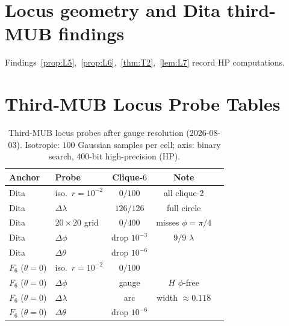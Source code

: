 \documentclass[onecolumn]{IEEEtran}
\begin{document}
\appendices
\section{Locus geometry and Dita third-MUB findings}
\label{sec:proofs}
Findings~\ref{prop:L5},~\ref{prop:L6},~\ref{thm:T2},~\ref{lem:L7} record HP computations.



\section{Third-MUB Locus Probe Tables}
\label{app:probes}

\begin{table}[ht]
\caption{Third-MUB locus probes after gauge resolution (2026-08-03). Isotropic: $100$ Gaussian samples per cell; axis: binary search, 400-bit high-precision (HP).}
\label{tab:locusdim}
\centering
\footnotesize
\setlength{\tabcolsep}{2.5pt}
\begin{tabular}{@{}>{\raggedright\arraybackslash}p{0.48in}>{\raggedright\arraybackslash}p{0.62in}cc>{\raggedright\arraybackslash}p{0.72in}@{}}
\toprule
Anchor & Probe & Clique-$6$ & Note \\
\midrule
Dita & iso.\ $r{=}10^{-2}$ & $0/100$ & all clique-$2$ \\
Dita & $\Delta\lambda$ & $126/126$ & full circle \\
Dita & $20{\times}20$ grid & $0/400$ & misses $\phi{=}\pi/4$ \\
Dita & $\Delta\phi$ & drop $10^{-3}$ & $9/9$ $\lambda$ \\
Dita & $\Delta\theta$ & drop $10^{-6}$ & \\
$F_6$ ($\theta{=}0$) & iso.\ $r{=}10^{-2}$ & $0/100$ & \\
$F_6$ ($\theta{=}0$) & $\Delta\phi$ & gauge & $H$ $\phi$-free \\
$F_6$ ($\theta{=}0$) & $\Delta\lambda$ & arc & width $\approx0.118$ \\
$F_6$ ($\theta{=}0$) & $\Delta\theta$ & drop $10^{-6}$ & \\
\bottomrule
\end{tabular}
\end{table}
\end{document}

